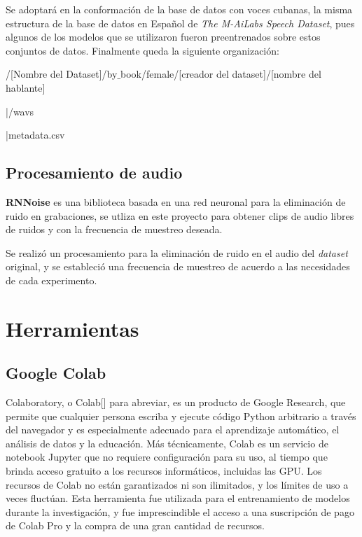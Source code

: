  Se adoptará en la conformación de la base de datos con voces cubanas, la misma estructura de la base de datos en Español de \textit{The M-AiLabs Speech Dataset}, pues algunos de los modelos que se utilizaron fueron preentrenados sobre estos conjuntos de datos. Finalmente queda la siguiente organización:
 
\begin{flushleft}
	/[Nombre del Dataset]/by$\_$book/female/[creador del dataset]/[nombre del hablante]
	
	|/wavs
	
	|metadata.csv
\end{flushleft}


\subsection{Procesamiento de audio}

\textbf{RNNoise} es una biblioteca basada en una red neuronal para la eliminación de ruido en grabaciones, se utliza en este proyecto para obtener clips de audio libres de ruidos y con la frecuencia de muestreo deseada.

Se realizó un procesamiento para la eliminación de ruido en el audio del \textit{dataset} original, y se estableció una frecuencia de muestreo de acuerdo a las necesidades de cada experimento. 

\section{Herramientas}
\subsection{Google Colab}
Colaboratory, o Colab[\cite{colab}] para abreviar, es un producto de Google Research, que permite que cualquier persona escriba y ejecute código Python arbitrario a través del navegador y es especialmente adecuado para el aprendizaje automático, el análisis de datos y la educación. Más técnicamente, Colab es un servicio de notebook Jupyter que no requiere configuración para su uso, al tiempo que brinda acceso gratuito a los recursos informáticos, incluidas las GPU. Los recursos de Colab no están garantizados ni son ilimitados, y los límites de uso a veces fluctúan. Esta herramienta fue utilizada para el entrenamiento de modelos durante la investigación, y fue imprescindible el acceso a una suscripción de pago de Colab Pro y la compra de una gran cantidad de recursos. 

